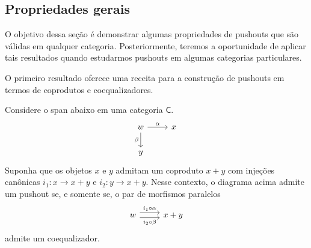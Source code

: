 \subsection{Propriedades gerais}

O objetivo dessa seção é demonstrar algumas propriedades de pushouts que são válidas em qualquer categoria.
Posteriormente, teremos a oportunidade de aplicar tais resultados quando estudarmos pushouts em algumas categorias particulares.

O primeiro resultado oferece uma receita para a construção de pushouts em termos de  coprodutos e coequalizadores.

\begin{teo}
   Considere o span abaixo em uma categoria $\mathsf{C}$.
   \begin{displaymath}
    \begin{tikzcd}
        w
        \arrow[r, "\alpha"]
        \arrow[d, "\beta" swap]
        & x
        \\ y
    \end{tikzcd}
   \end{displaymath}
   Suponha que os objetos $x$ e $y$ admitam um coproduto $x+y$ com injeções canônicas $i_1: x \to x + y$ e $i_2: y \to x+y$.
   Nesse contexto, o diagrama acima admite um pushout se, e somente se, o par de morfismos paralelos
   \begin{displaymath}
    \begin{tikzcd}
        w
        \arrow[r, shift left=1.25, "i_1 \circ \alpha"]
        \arrow[r, shift right=1.25, "i_2 \circ \beta" swap]
        & x+y
    \end{tikzcd}
   \end{displaymath}
   admite um coequalizador.
\end{teo}

